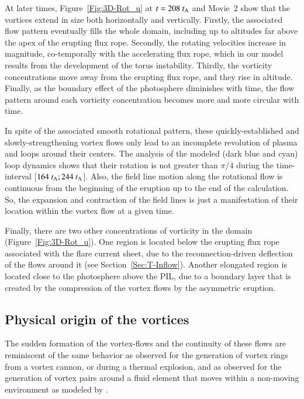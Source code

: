\documentclass[apj]{emulateapj}
\newcommand{\tA}{t_{\rm A}}
\begin{document}
At later times, Figure~\ref{Fig:3D-Rot_u} at $t=208~\tA$ and Movie~2 show that the vortices extend in size both horizontally and vertically. Firstly, the associated flow pattern eventually fills the whole domain, including up to altitudes far above the apex of the erupting flux rope. Secondly, the rotating velocities increase in magnitude, co-temporally with the accelerating flux rope, which in our model results from the development of the torus instability. Thirdly, the  vorticity concentrations move away from the erupting flux rope, and they rise in altitude. Finally, as the boundary effect of the photosphere diminishes with time, the flow pattern around each vorticity concentration becomes more and more circular with time. 

In spite of the associated smooth rotational pattern, these quickly-established and slowly-strengthening vortex flows only lead to an incomplete revolution of plasma and loops around their centers. The analysis of the modeled (dark blue and cyan) loop dynamics shows that their rotation is not greater than $\pi/4$ during the time-interval [$164~\tA ; 244~\tA$]. Also, the  field line  motion along the rotational flow is continuous from the beginning of the eruption up to the end of the calculation.  So, the  expansion and contraction of the field lines is just a manifestation of their location within the vortex flow at a given time. 

Finally, there are two other concentrations of vorticity in the domain (Figure~\ref{Fig:3D-Rot_u}). One region is located below the erupting flux rope associated with the flare current sheet, due to the reconnection-driven deflection of the flows around it (see Section~\ref{Sec:T-Inflow}). Another elongated region is located close to the photosphere above the PIL, due to a boundary layer that is created by the compression of the vortex flows by the asymmetric eruption. 


\subsection{Physical origin of the vortices}

The sudden formation of the vortex-flows and the continuity of these flows are reminiscent of the same behavior as observed for the generation of vortex rings from a vortex cannon, or during a thermal explosion, and as observed for the generation of vortex pairs around a fluid element that moves within a non-moving environment as modeled by  \cite{Belmont2013}. 
\end{document}
